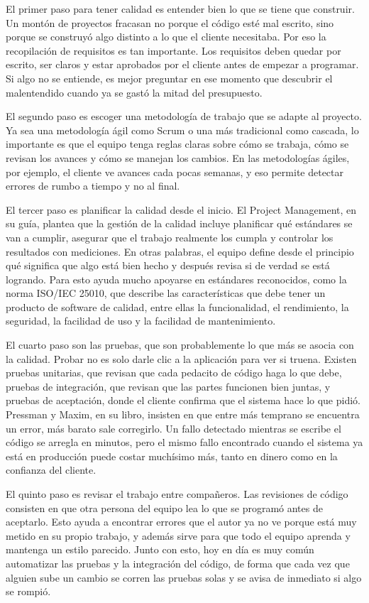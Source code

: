 \documentclass[12pt,letterpaper]{article}
\begin{document}
El primer paso para tener calidad es entender bien lo que se tiene que construir. Un montón de proyectos fracasan no porque el código esté mal escrito, sino porque se construyó algo distinto a lo que el cliente necesitaba. Por eso la recopilación de requisitos es tan importante. Los requisitos deben quedar por escrito, ser claros y estar aprobados por el cliente antes de empezar a programar. Si algo no se entiende, es mejor preguntar en ese momento que descubrir el malentendido cuando ya se gastó la mitad del presupuesto.

El segundo paso es escoger una metodología de trabajo que se adapte al proyecto. Ya sea una metodología ágil como Scrum o una más tradicional como cascada, lo importante es que el equipo tenga reglas claras sobre cómo se trabaja, cómo se revisan los avances y cómo se manejan los cambios. En las metodologías ágiles, por ejemplo, el cliente ve avances cada pocas semanas, y eso permite detectar errores de rumbo a tiempo y no al final.

El tercer paso es planificar la calidad desde el inicio. El Project Management, en su guía, plantea que la gestión de la calidad incluye planificar qué estándares se van a cumplir, asegurar que el trabajo realmente los cumpla y controlar los resultados con mediciones. En otras palabras, el equipo define desde el principio qué significa que algo está bien hecho y después revisa si de verdad se está logrando. Para esto ayuda mucho apoyarse en estándares reconocidos, como la norma ISO/IEC 25010, que describe las características que debe tener un producto de software de calidad, entre ellas la funcionalidad, el rendimiento, la seguridad, la facilidad de uso y la facilidad de mantenimiento.

El cuarto paso son las pruebas, que son probablemente lo que más se asocia con la calidad. Probar no es solo darle clic a la aplicación para ver si truena. Existen pruebas unitarias, que revisan que cada pedacito de código haga lo que debe, pruebas de integración, que revisan que las partes funcionen bien juntas, y pruebas de aceptación, donde el cliente confirma que el sistema hace lo que pidió. Pressman y Maxim, en su libro, insisten en que entre más temprano se encuentra un error, más barato sale corregirlo. Un fallo detectado mientras se escribe el código se arregla en minutos, pero el mismo fallo encontrado cuando el sistema ya está en producción puede costar muchísimo más, tanto en dinero como en la confianza del cliente.

El quinto paso es revisar el trabajo entre compañeros. Las revisiones de código consisten en que otra persona del equipo lea lo que se programó antes de aceptarlo. Esto ayuda a encontrar errores que el autor ya no ve porque está muy metido en su propio trabajo, y además sirve para que todo el equipo aprenda y mantenga un estilo parecido. Junto con esto, hoy en día es muy común automatizar las pruebas y la integración del código, de forma que cada vez que alguien sube un cambio se corren las pruebas solas y se avisa de inmediato si algo se rompió.
\end{document}
